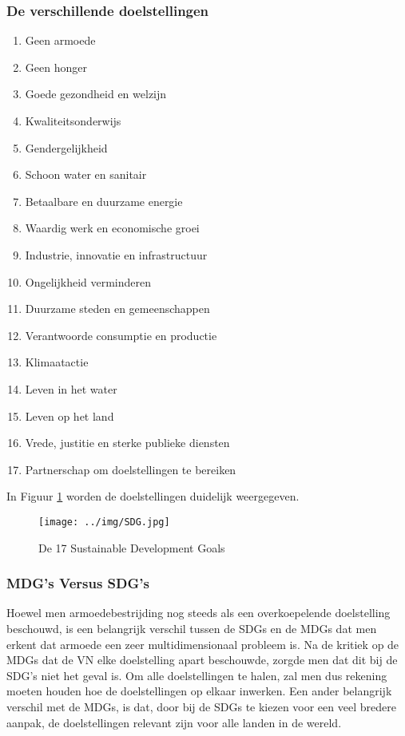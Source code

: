  \subsubsection{De verschillende doelstellingen}
 \begin{enumerate}
 	\item Geen armoede
 		\item Geen honger
 		\item Goede gezondheid en welzijn
 		\item Kwaliteitsonderwijs
 		\item Gendergelijkheid
 		\item Schoon water en sanitair
 		\item Betaalbare en duurzame energie
 		\item Waardig werk en economische groei
 		\item Industrie, innovatie en infrastructuur
 		\item Ongelijkheid verminderen
 		\item Duurzame steden en gemeenschappen
 		\item Verantwoorde consumptie en productie
 		\item Klimaatactie
 		\item Leven in het water
 		\item Leven op het land
 		\item Vrede, justitie en sterke publieke diensten
 		\item Partnerschap om doelstellingen te bereiken
 \end{enumerate}
\autocite{VerenigdeNaties2004}

In Figuur \ref{SDGs} worden de doelstellingen duidelijk weergegeven.
 
 \begin{figure}[h!]
 	\texttt{[image: ../img/SDG.jpg]}
 	\caption{De 17 Sustainable Development Goals \autocite{VerenigdeNaties2004}}
 	\label{SDGs}
 \end{figure}

\subsubsection{MDG's Versus SDG's}
Hoewel men armoedebestrijding nog steeds als een overkoepelende doelstelling beschouwd, is een belangrijk verschil tussen de SDGs en de  MDGs dat men erkent dat armoede een zeer multidimensionaal probleem is. Na de kritiek op de MDGs dat de VN elke doelstelling apart beschouwde, zorgde men dat dit bij de SDG's niet het geval is. Om alle doelstellingen te halen, zal men dus rekening moeten houden hoe de doelstellingen op elkaar inwerken. Een ander belangrijk verschil met de MDGs, is dat, door bij de SDGs te kiezen voor een veel bredere aanpak, de doelstellingen relevant zijn voor alle landen in de wereld. \autocite{VN2015}


